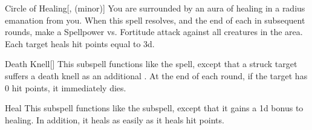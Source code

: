 \begin{ability}[\nth{4}]{Circle of Healing}[,  (minor)]
You are surrounded by an aura of healing in a \areamed radius emanation from you.
When this spell resolves, and the end of each  in subsequent rounds, make a Spellpower vs. Fortitude attack against all creatures in the area.
\hit Each target heals hit points equal to  \minus3d.
\end{ability}
\vspace{0.25em}


\begin{ability}[\nth{4}]{Death Knell}[]
This subspell functions like the  spell, except that a struck target suffers a death knell as an additional .
At the end of each round, if the target has 0 hit points, it immediately dies.
\end{ability}
\vspace{0.25em}


\begin{ability}[\nth{6}]{Heal}
This subspell functions like the  subspell, except that it gains a \plus1d bonus to healing.
In addition, it heals  as easily as it heals hit points.
\end{ability}
\vspace{0.25em}

